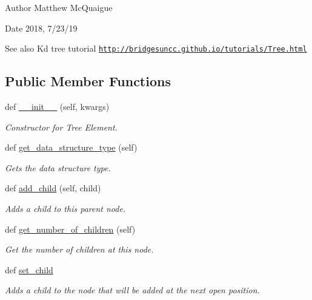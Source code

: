 \begin{DoxyAuthor}{Author}
Matthew Mc\+Quaigue
\end{DoxyAuthor}
\begin{DoxyDate}{Date}
2018, 7/23/19 
\end{DoxyDate}
\begin{DoxySeeAlso}{See also}
Kd tree tutorial \href{http://bridgesuncc.github.io/tutorials/Tree.html}{\tt http\+://bridgesuncc.\+github.\+io/tutorials/\+Tree.\+html} 
\end{DoxySeeAlso}
\subsection*{Public Member Functions}
\begin{DoxyCompactItemize}
\item 
def \mbox{\hyperlink{classbridges_1_1tree__element_1_1_tree_element_a37f9f119e4a1c0ff01b30bbb2f505a97}{\+\_\+\+\_\+init\+\_\+\+\_\+}} (self, kwargs)
\begin{DoxyCompactList}\small\item\em Constructor for Tree Element. \end{DoxyCompactList}\item 
def \mbox{\hyperlink{classbridges_1_1tree__element_1_1_tree_element_aeefaf309c1271b2e7272cf63be496457}{get\+\_\+data\+\_\+structure\+\_\+type}} (self)
\begin{DoxyCompactList}\small\item\em Gets the data structure type. \end{DoxyCompactList}\item 
def \mbox{\hyperlink{classbridges_1_1tree__element_1_1_tree_element_a7a5933a3de19a896712389dda41a4452}{add\+\_\+child}} (self, child)
\begin{DoxyCompactList}\small\item\em Adds a child to this parent node. \end{DoxyCompactList}\item 
def \mbox{\hyperlink{classbridges_1_1tree__element_1_1_tree_element_a5d0c6335324d675a6c0329dad72fca4d}{get\+\_\+number\+\_\+of\+\_\+children}} (self)
\begin{DoxyCompactList}\small\item\em Get the number of children at this node. \end{DoxyCompactList}\item 
def \mbox{\hyperlink{classbridges_1_1tree__element_1_1_tree_element_adb855562b31567f39e41e312f87ab98b}{set\+\_\+child}}
\begin{DoxyCompactList}\small\item\em Adds a child to the node that will be added at the next open position. \end{DoxyCompactList}\item 

\end{DoxyCompactItemize}
